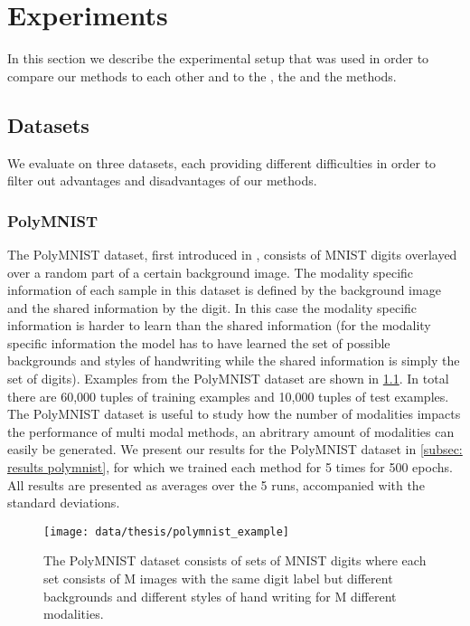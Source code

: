 \chapter{Experiments}
In this section we describe the experimental setup that was used in order to compare our methods to each other and to the , the  and the  methods.

\section{Datasets}
We evaluate on three datasets, each providing different difficulties in order to filter out advantages and disadvantages of our methods.

\subsection{PolyMNIST} \label{polymnist}
The PolyMNIST dataset, first introduced in \cite{sutter_multimodal_2020}, consists of MNIST digits overlayed over a random part of a certain background image.
The modality specific information of each sample in this dataset is defined by the background image and the shared information by the digit.
In this case the modality specific information is harder to learn than the shared information (for the modality specific information the model has to have learned the set of possible backgrounds and styles of handwriting while the shared information is simply the set of digits).
Examples from the PolyMNIST dataset are shown in \cref{fig:PolyMNIST}.
In total there are 60,000 tuples of training examples and 10,000 tuples of test examples.
The PolyMNIST dataset is useful to study how the number of modalities impacts the performance of multi modal methods, an abritrary amount of modalities can easily be generated.
We present our results for the PolyMNIST dataset in \cref{subsec: results polymnist}, for which we trained each method for 5 times for 500 epochs.
All results are presented as averages over the 5 runs, accompanied with the standard deviations.


\begin{figure}[h!]
    \centering
    \texttt{[image: data/thesis/polymnist\_example]}
    \caption{The PolyMNIST dataset consists of sets of MNIST
    digits where each set consists of M images
    with the same digit label but different backgrounds
    and different styles of hand writing for M different modalities.}
    \label{fig:PolyMNIST}
\end{figure}

